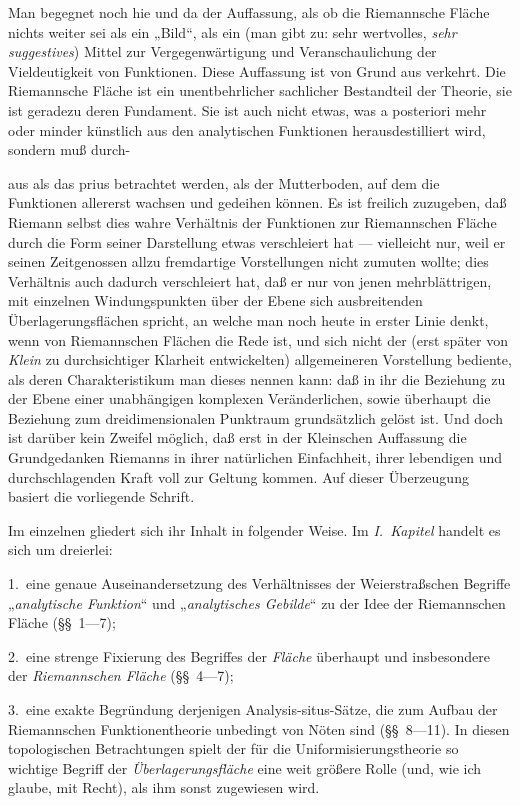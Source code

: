 \documentclass{article}
\begin{document}
Man begegnet noch hie und da der Auffassung, als ob die Riemannsche Fläche nichts weiter sei als ein „Bild“, als ein (man gibt zu: sehr wertvolles, \emph{sehr suggestives}) Mittel zur Vergegenwärtigung und Veranschaulichung der Vieldeutigkeit von Funktionen. Diese Auffassung ist von Grund aus verkehrt. Die Riemannsche Fläche ist ein unentbehrlicher sachlicher Bestandteil der Theorie, sie ist geradezu deren Fundament. Sie ist auch nicht etwas, was a posteriori mehr oder minder künstlich aus den analytischen Funktionen herausdestilliert wird, sondern muß durch-

aus als das prius betrachtet werden, als der Mutterboden, auf dem die Funktionen allererst wachsen und gedeihen können. Es ist freilich zuzugeben, daß Riemann selbst dies wahre Verhältnis der Funktionen zur Riemannschen Fläche durch die Form seiner Darstellung etwas verschleiert hat --- vielleicht nur, weil er seinen Zeitgenossen allzu fremdartige Vorstellungen nicht zumuten wollte; dies Verhältnis auch dadurch verschleiert hat, daß er nur von jenen mehrblättrigen, mit einzelnen Windungspunkten über der Ebene sich ausbreitenden Überlagerungsflächen spricht, an welche man noch heute in erster Linie denkt, wenn von Riemannschen Flächen die Rede ist, und sich nicht der (erst später von \emph{Klein} zu durchsichtiger Klarheit entwickelten) allgemeineren Vorstellung bediente, als deren Charakteristikum man dieses nennen kann: daß in ihr die Beziehung zu der Ebene einer unabhängigen komplexen Veränderlichen, sowie überhaupt die Beziehung zum dreidimensionalen Punktraum grundsätzlich gelöst ist. Und doch ist darüber kein Zweifel möglich, daß erst in der Kleinschen Auffassung die Grundgedanken Riemanns in ihrer natürlichen Einfachheit, ihrer lebendigen und durchschlagenden Kraft voll zur Geltung kommen. Auf dieser Überzeugung basiert die vorliegende Schrift.

Im einzelnen gliedert sich ihr Inhalt in folgender Weise. Im \emph{I.~Kapitel} handelt es sich um dreierlei:

1.\ eine genaue Auseinandersetzung des Verhältnisses der Weierstraßschen Begriffe „\emph{analytische Funktion}“ und „\emph{analytisches Gebilde}“ zu der Idee der Riemannschen Fläche (§§~1---7);

2.\ eine strenge Fixierung des Begriffes der \emph{Fläche} überhaupt und insbesondere der \emph{Riemannschen Fläche} (§§~4---7);

3.\ eine exakte Begründung derjenigen Analysis-situs-Sätze, die zum Aufbau der Riemannschen Funktionentheorie unbedingt von Nöten sind (§§~8---11). In diesen topologischen Betrachtungen spielt der für die Uniformisierungstheorie so wichtige Begriff der \emph{Überlagerungsfläche} eine weit größere Rolle (und, wie ich glaube, mit Recht), als ihm sonst zugewiesen wird.
\end{document}
